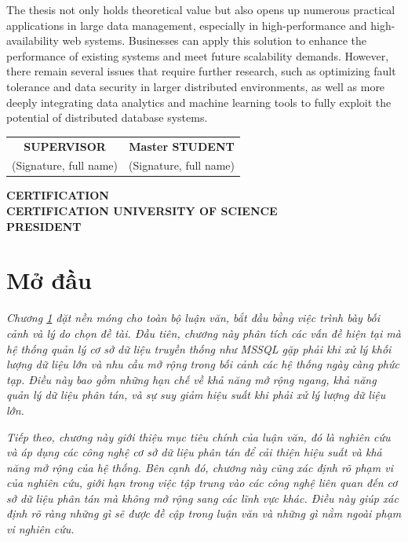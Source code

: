 \documentclass[50pt]{extarticle}
\begin{document}
The thesis not only holds theoretical value but also opens up numerous practical applications in large data management, especially in high-performance and high-availability web systems. Businesses can apply this solution to enhance the performance of existing systems and meet future scalability demands. However, there remain several issues that require further research, such as optimizing fault tolerance and data security in larger distributed environments, as well as more deeply integrating data analytics and machine learning tools to fully exploit the potential of distributed database systems.

\begin{center}
    \begin{tabular}{c c}
        \textbf{SUPERVISOR} & \textbf{Master STUDENT} \\
        (Signature, full name) & (Signature, full name) \\
    \end{tabular}
    
    \vspace{6cm} %
    
    \textbf{CERTIFICATION} \\
    \textbf{CERTIFICATION UNIVERSITY OF SCIENCE} \\
    \textbf{PRESIDENT}
\end{center}

\pagebreak

    
    




\section{Mở đầu}
\label{sec:introduction}

\textit{Chương \ref{sec:introduction} đặt nền móng cho toàn bộ luận văn, bắt đầu bằng việc trình bày bối cảnh và lý do chọn đề tài. Đầu tiên, chương này phân tích các vấn đề hiện tại mà hệ thống quản lý cơ sở dữ liệu truyền thống như MSSQL gặp phải khi xử lý khối lượng dữ liệu lớn và nhu cầu mở rộng trong bối cảnh các hệ thống ngày càng phức tạp. Điều này bao gồm những hạn chế về khả năng mở rộng ngang, khả năng quản lý dữ liệu phân tán, và sự suy giảm hiệu suất khi phải xử lý lượng dữ liệu lớn.}

\textit{Tiếp theo, chương này giới thiệu mục tiêu chính của luận văn, đó là nghiên cứu và áp dụng các công nghệ cơ sở dữ liệu phân tán để cải thiện hiệu suất và khả năng mở rộng của hệ thống. Bên cạnh đó, chương này cũng xác định rõ phạm vi của nghiên cứu, giới hạn trong việc tập trung vào các công nghệ liên quan đến cơ sở dữ liệu phân tán mà không mở rộng sang các lĩnh vực khác. Điều này giúp xác định rõ ràng những gì sẽ được đề cập trong luận văn và những gì nằm ngoài phạm vi nghiên cứu.}
\end{document}
